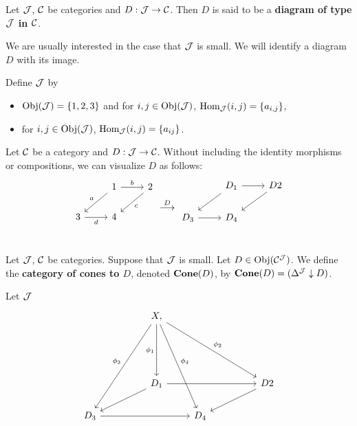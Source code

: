 \documentclass{book}
\begin{document}
	\begin{defn}
		Let $\mathcal{J}$, $\mathcal{C}$ be categories and $D: \mathcal{J} \rightarrow \mathcal{C}$. Then $D$ is said to be a \textbf{diagram of type $\mathcal{J}$ in $\mathcal{C}$}.
	\end{defn}

	\begin{note}
		We are usually interested in the case that $\mathcal{J}$ is small. We will identify a diagram $D$ with its image. 
	\end{note}

	\begin{exmp}
		Define $\mathcal{J}$ by
		\begin{itemize}
			\item  $\operatorname{Obj}(\mathcal{J}) = \{1, 2, 3\}$ and for $i,j \in \operatorname{Obj}(\mathcal{J})$, $\operatorname{Hom}_{\mathcal{J}}(i, j) = \{a_{i,j}\}$,
			\item for $i,j \in \operatorname{Obj}(\mathcal{J})$, $\operatorname{Hom}_{\mathcal{J}}(i,j) = \{a_{ij}\}$.
		\end{itemize}
		Let $\mathcal{C}$ be a category and $D: \mathcal{J} \rightarrow \mathcal{C}$. Without including the identity morphisms or compositions, we can visualize $D$ as follows:
		\[
		\begin{tikzcd}
			&     1  \arrow[dl, "a"'] \arrow[r, "b"]        &  2 \arrow[dl, "c"] \\
			3 \arrow[r, "d"'] &        4   & \\
		\end{tikzcd}
		\overset{D}{\longrightarrow}
		\begin{tikzcd}
			&     D_1  \arrow[dl] \arrow[r]        &  D2 \arrow[dl] \\
			D_3 \arrow[r] &        D_4   & \\
		\end{tikzcd}
		\]
	\end{exmp}

	\begin{defn}
		Let $\mathcal{J}$, $\mathcal{C}$ be categories. Suppose that $\mathcal{J}$ is small. Let $D \in \operatorname{Obj}(\mathcal{C}^{\mathcal{J}})$. We define the \textbf{category of cones to $D$}, denoted $\operatorname*{\text{\textbf{Cone}}}(D)$, by $\operatorname*{\text{\textbf{Cone}}}(D) = (\Delta^{\mathcal{J}} \downarrow D)$.
	\end{defn}


	\begin{exmp}
		Let $\mathcal{J}$
		\[
		\begin{tikzcd}
			&  &  X \arrow[ddd, "\phi_1"'] \arrow[ddddll, "\phi_3"']  \arrow[dddrrr, "\phi_2"], \arrow[ddddr, "\phi_4"] &       &    \\
			&       &     &       &    \\
			&       &     &       &    \\
			&       &  D_1  \arrow[dll] \arrow[rrr]    &       & &  D2 \arrow[dll] \\
			D_3 \arrow[rrr] &       &     &  D_4  &    \\
		\end{tikzcd}
		\]
	\end{exmp}
	
\end{document}

